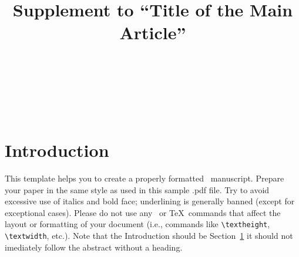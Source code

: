 \documentclass[te,nameyear,final,supplement]{econsocart}
\theoremstyle{plain}
\theoremstyle{definition}
\begin{document}
\begin{frontmatter}

\title{Supplement to ``Title of the Main Article''}

\begin{aug}
%
%
%
\author[add1,add11]{~}
\author[add2]{~}
\author[add2]{~}
\address[add1]{%
,
}

\address[add11]{%
,
}

\address[add2]{%
,
}
\end{aug}


\end{frontmatter}

\section{Introduction}\label{s1}

This template helps you to create a properly formatted \LaTeXe\ manuscript.
Prepare your paper in the same style as used in this sample .pdf file.
Try to avoid excessive use of italics and bold face; underlining is generally banned (except for exceptional cases). Please do not use any \LaTeXe\ or \TeX\ commands that affect the layout or formatting of your document (i.e., commands like \verb|\textheight|, \verb|\textwidth|, etc.). Note that the Introduction should be Section~\ref{s1} it should not imediately follow the abstract without a heading.
\end{document}
